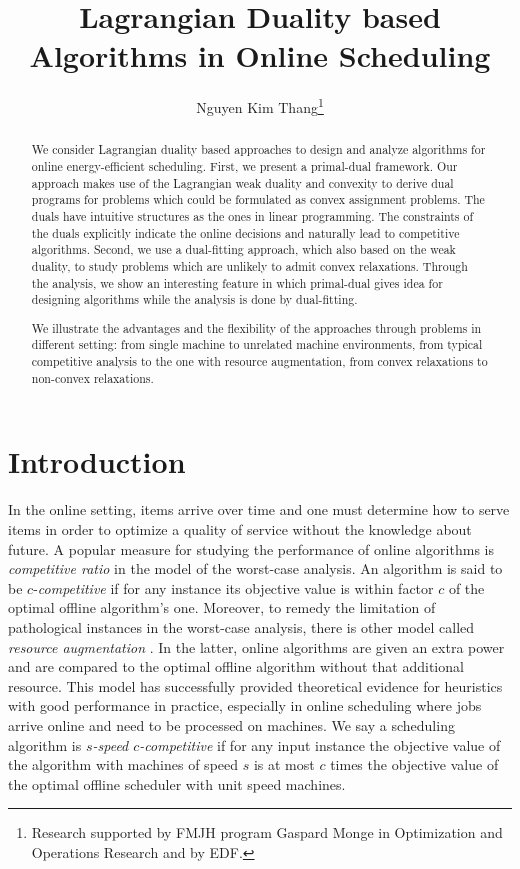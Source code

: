 \documentclass[11pt]{article}
\title{Lagrangian Duality based Algorithms in Online Scheduling}
\author{Nguyen Kim Thang\thanks{Research supported by FMJH program Gaspard Monge in Optimization and
Operations Research and by EDF.}}
\affil{IBISC, University of Evry Val d'Essonne, France }
\date{}
\begin{document}
\maketitle


\begin{abstract}
We consider Lagrangian duality based approaches to design and analyze 
algorithms for online energy-efficient scheduling. 
First, we present a primal-dual framework. 
Our approach makes use of the Lagrangian weak duality and convexity to derive 
dual programs for problems which could be formulated as convex assignment
problems. The duals have intuitive structures as the ones in linear programming.
The constraints of the duals explicitly indicate the online decisions
and naturally lead to competitive algorithms. 
Second, we use a dual-fitting approach, which also based on the weak duality, 
to study problems which are unlikely to admit convex relaxations. Through the analysis,
we show an interesting feature in which 
primal-dual gives idea for designing algorithms while the analysis 
is done by dual-fitting.

We illustrate the advantages and the flexibility of the approaches through problems 
in different setting: from single machine 
to unrelated machine environments, from typical competitive analysis to the one with
resource augmentation, from convex relaxations to non-convex relaxations.
\end{abstract}

\newpage 
\tableofcontents


\section{Introduction}	\label{sec:intro}

In the online setting, items arrive over time 
and one must determine how to serve items in order to optimize a quality of 
service without the knowledge about future. 
A popular measure for studying the performance of online algorithms is 
\emph{competitive ratio} in the model of the worst-case analysis. 
An algorithm is said to be $c$-\emph{competitive}
if for any instance its objective value is within factor $c$ of the optimal offline algorithm's one.  
Moreover, to remedy the limitation of pathological instances in the worst-case analysis, 
there is other model called \emph{resource augmentation} \cite{KalyanasundaramPruhs00:Speed-is-as-powerful}. 
In the latter, online algorithms are given an extra power and are compared to the optimal 
offline algorithm without that additional resource. This model has successfully provided theoretical evidence for 
heuristics with good performance in practice, especially in online scheduling where 
jobs arrive online and need to be processed on machines. 
We say a scheduling algorithm is \emph{$s$-speed $c$-competitive}
if for any input instance the objective value of the algorithm with machines of 
speed $s$ is at most $c$ times the objective value of the optimal offline scheduler
with unit speed machines. 
\end{document}
